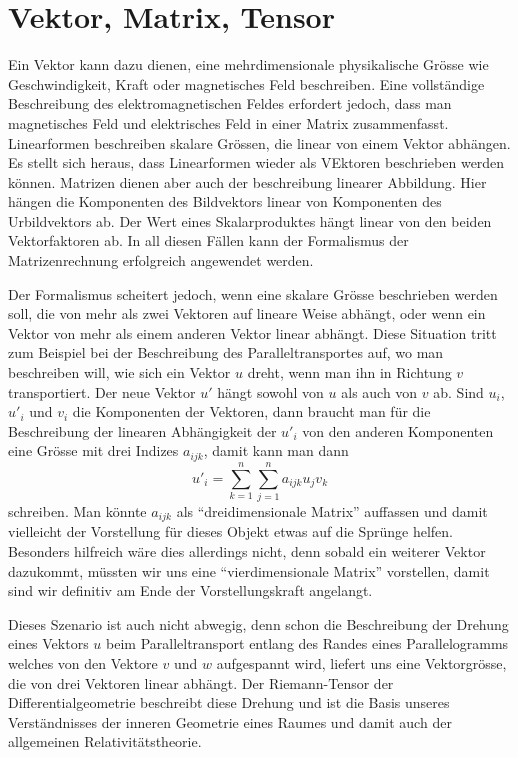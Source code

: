 %
%
%
\section{Vektor, Matrix, Tensor}
Ein Vektor kann dazu dienen, eine mehrdimensionale physikalische
Grösse wie Geschwindigkeit, Kraft oder magnetisches Feld beschreiben.
Eine vollständige Beschreibung des elektromagnetischen Feldes erfordert
jedoch, dass man magnetisches Feld und elektrisches Feld in einer
Matrix zusammenfasst.
Linearformen beschreiben skalare Grössen, die linear von einem 
Vektor abhängen.
Es stellt sich heraus, dass Linearformen wieder als VEktoren beschrieben
werden  können.
Matrizen dienen aber auch der beschreibung linearer Abbildung.
Hier hängen die Komponenten des Bildvektors linear von Komponenten
des Urbildvektors ab.
Der Wert eines Skalarproduktes hängt linear von den beiden Vektorfaktoren ab.
In all diesen Fällen kann der Formalismus der Matrizenrechnung erfolgreich
angewendet werden.

Der Formalismus scheitert jedoch, wenn eine skalare Grösse beschrieben
werden soll, die von mehr als zwei Vektoren auf lineare Weise abhängt,
oder wenn ein Vektor von mehr als einem anderen Vektor linear abhängt.
Diese Situation tritt zum Beispiel bei der Beschreibung des
Paralleltransportes auf, wo man beschreiben will, wie sich ein Vektor 
$u$ dreht, wenn man ihn in Richtung $v$ transportiert.
Der neue Vektor $u'$ hängt sowohl von $u$ als auch von $v$ ab.
Sind $u_i$, $u'_i$ und $v_i$ die Komponenten der Vektoren, dann
braucht man für die Beschreibung der linearen Abhängigkeit der $u'_i$
von den anderen Komponenten eine Grösse mit drei Indizes $a_{ijk}$,
damit kann man dann
\begin{equation}
u'_i = \sum_{k=1}^n\sum_{j=1}^n a_{ijk}u_jv_k
\label{tensor:beispiel:summe}
\end{equation}
schreiben.
Man könnte $a_{ijk}$ als ``dreidimensionale Matrix'' auffassen und
damit vielleicht der Vorstellung für dieses Objekt etwas auf die Sprünge
helfen.
Besonders hilfreich wäre dies allerdings nicht, denn sobald ein weiterer
Vektor dazukommt, müssten wir uns eine ``vierdimensionale Matrix''
vorstellen, damit sind wir definitiv am Ende der Vorstellungskraft
angelangt.

Dieses Szenario ist auch nicht abwegig, denn schon die Beschreibung
der Drehung eines Vektors $u$ beim Paralleltransport entlang des
Randes eines Parallelogramms welches von den Vektore $v$ und $w$ 
aufgespannt wird, liefert uns eine Vektorgrösse, die von drei Vektoren
linear abhängt.
Der Riemann-Tensor der Differentialgeometrie beschreibt diese Drehung
und ist die Basis unseres Verständnisses der inneren Geometrie eines
Raumes und damit auch der allgemeinen Relativitätstheorie.

